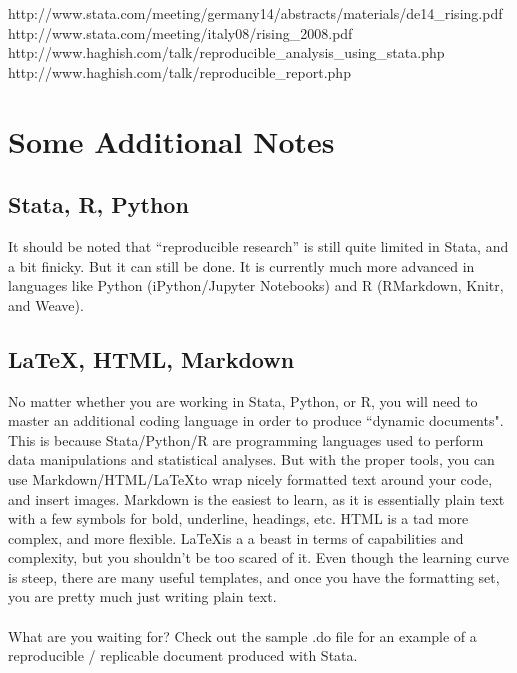 \documentclass[11pt]{article}
\begin{document}
http://www.stata.com/meeting/germany14/abstracts/materials/de14\_rising.pdf\\
http://www.stata.com/meeting/italy08/rising\_2008.pdf\\
http://www.haghish.com/talk/reproducible\_analysis\_using\_stata.php\\
http://www.haghish.com/talk/reproducible\_report.php

\section*{Some Additional Notes}

\subsection*{Stata, R, Python}

\noindent It should be noted that ``reproducible research'' is still quite limited in Stata, and a bit finicky. But it can still be done. It is currently much more advanced in languages like Python (iPython/Jupyter Notebooks) and R (RMarkdown, Knitr, and Weave).

\subsection*{\LaTeX, HTML, Markdown}

No matter whether you are working in Stata, Python, or R, you will need to master an additional coding language in order to produce ``dynamic documents". This is because Stata/Python/R are programming languages used to perform data manipulations and statistical analyses. But with the proper tools, you can use Markdown/HTML/\LaTeX to wrap nicely formatted text around your code, and insert images. Markdown is the easiest to learn, as it is essentially plain text with a few symbols for bold, underline, headings, etc. HTML is a tad more complex, and more flexible. \LaTeX is a a beast in terms of capabilities and complexity, but you shouldn't be too scared of it. Even though the learning curve is steep, there are many useful templates, and once you have the formatting set, you are pretty much just writing plain text.\\
\\
What are you waiting for? Check out the sample .do file for an example of a reproducible / replicable document produced with Stata.
\end{document}
